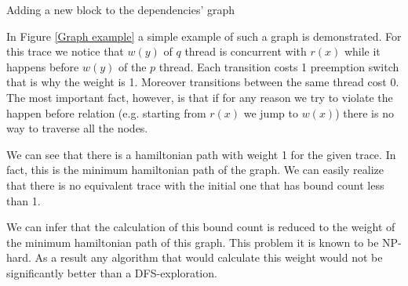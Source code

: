 \begin{algorithm}[H]
    \caption{Adding a new block to the dependencies' graph}
    \label{Adding a new block to the dependencies graph}
\end{algorithm}



In Figure \ref{Graph example} a simple example of such a graph is demonstrated. For this trace we notice that $w(y)$ of
$q$ thread is concurrent with $r(x)$ while it happens before $w(y)$ of the $p$ thread. Each transition costs 1
preemption switch that is why the weight is 1. Moreover transitions between the same thread cost 0. The most important
fact, however, is that if for any reason we try to violate the happen before relation (e.g. starting from $r(x)$ we jump
to $w(x)$) there is no way to traverse all the nodes. 

We can see that there is a hamiltonian path with weight 1 for the given trace. In fact, this is the minimum hamiltonian
path of the graph. We can easily realize that there is no equivalent trace with the initial one that has bound count
less than 1. 

We can infer that the calculation of this bound count is reduced to the weight of the minimum hamiltonian path of this
graph. This problem it is known to be NP-hard. As a result any algorithm that would calculate this weight would not
be significantly better than a DFS-exploration. 

